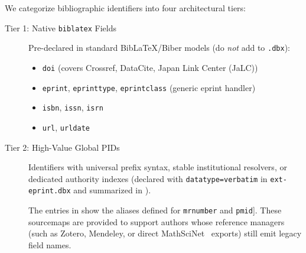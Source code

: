\documentclass[12pt, twoside]{article}
\begin{document}
We categorize bibliographic identifiers into four architectural tiers:
\begin{description}
    \item[Tier 1: Native \texttt{biblatex} Fields] Pre-declared in standard BibLaTeX/Biber models (do \emph{not} add to \texttt{.dbx}):
    \begin{itemize}
        \item \texttt{doi} (covers Crossref, DataCite, Japan Link Center (JaLC))
        \item \texttt{eprint}, \texttt{eprinttype}, \texttt{eprintclass} (generic eprint handler)
        \item \texttt{isbn}, \texttt{issn}, \texttt{isrn}
        \item \texttt{url}, \texttt{urldate}
    \end{itemize}

    \item[Tier 2: High-Value Global PIDs] Identifiers with universal prefix syntax, stable institutional resolvers, or dedicated authority indexes (declared with \texttt{datatype=verbatim} in \texttt{ext-eprint.dbx} and summarized in ).

    The entries in  show the aliases defined for \texttt{mrnumber} and \texttt{pmid}]. These sourcemaps are provided to support authors whose reference managers (such as Zotero, Mendeley, or direct MathSciNet \BibTeX\ exports) still emit legacy field names.


\end{description}
\end{document}

